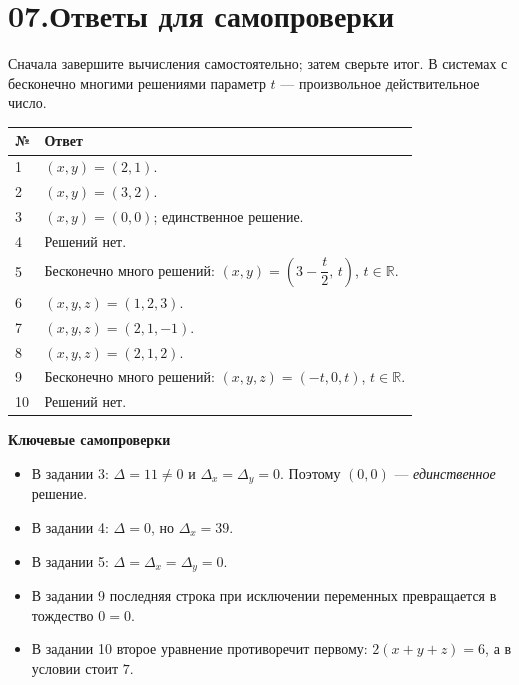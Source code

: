 \documentclass[a4paper,12pt]{article}
\newcommand{\subnote}[1]{{\color{softgray}\small #1}}
\begin{document}
\section*{\color{darkaccent}07.\quad Ответы для самопроверки}
\subnote{Сначала завершите вычисления самостоятельно; затем сверьте итог.
В системах с бесконечно многими решениями параметр $t$ --- произвольное
действительное число.}

\vspace{6mm}
\renewcommand{\arraystretch}{1.55}
\begin{tabularx}{\linewidth}{@{}p{15mm}X@{}}
\toprule
№ & Ответ\\
\midrule
1 & $(x,y)=(2,1)$.\\
2 & $(x,y)=(3,2)$.\\
3 & $(x,y)=(0,0)$; единственное решение.\\
4 & Решений нет.\\
5 & Бесконечно много решений:
$(x,y)=\left(3-\dfrac{t}{2},\,t\right)$, $t\in\mathbb R$.\\
6 & $(x,y,z)=(1,2,3)$.\\
7 & $(x,y,z)=(2,1,-1)$.\\
8 & $(x,y,z)=(2,1,2)$.\\
9 & Бесконечно много решений:
$(x,y,z)=(-t,0,t)$, $t\in\mathbb R$.\\
10 & Решений нет.\\
\bottomrule
\end{tabularx}

\vspace{10mm}
\textbf{Ключевые самопроверки}

\begin{itemize}[leftmargin=7mm,itemsep=0.55em]
\item В задании 3: $\Delta=11\ne0$ и
$\Delta_x=\Delta_y=0$. Поэтому $(0,0)$ --- \emph{единственное} решение.
\item В задании 4: $\Delta=0$, но $\Delta_x=39$.
\item В задании 5: $\Delta=\Delta_x=\Delta_y=0$.
\item В задании 9 последняя строка при исключении переменных
превращается в тождество $0=0$.
\item В задании 10 второе уравнение противоречит первому:
$2(x+y+z)=6$, а в условии стоит $7$.
\end{itemize}
\end{document}
